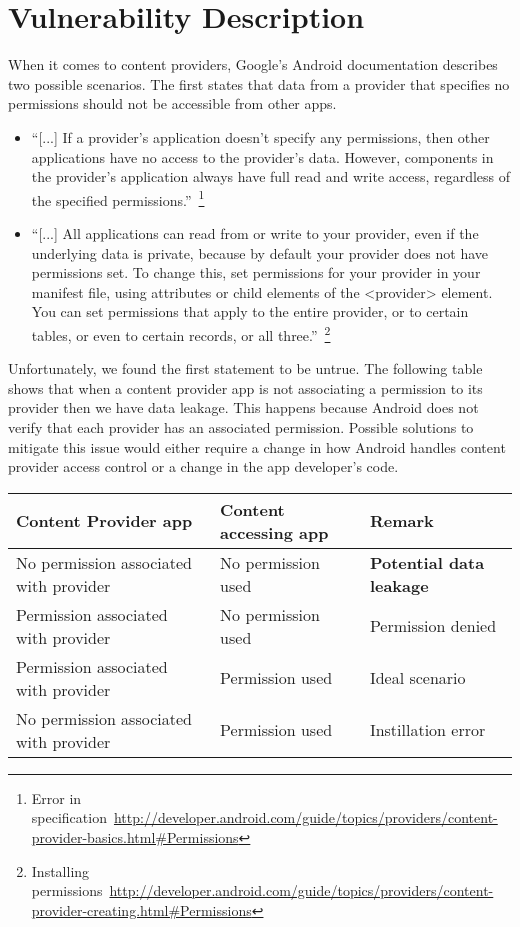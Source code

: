 \section{Vulnerability Description}
\label{vuln}
\noindent
When it comes to content providers, Google's Android documentation
describes two possible scenarios. The first states that data from
a provider
that specifies no permissions should not be accessible from other apps.
\begin{itemize}
 \item ``[...] If a provider's application doesn't specify any permissions, then other applications have no access to the provider's data. However, components in the provider's application always have full read and write access, regardless of the specified permissions.''~\footnote{Error in specification~\url{http://developer.android.com/guide/topics/providers/content-provider-basics.html#Permissions}}
 \item ``[...] All applications can read from or write to your provider, even if the underlying data is private, because by default your provider does not have permissions set. To change this, set permissions for your provider in your manifest file, using attributes or child elements of the <provider> element. You can set permissions that apply to the entire provider, or to certain tables, or even to certain records, or all three.''~\footnote{Installing permissions~\url{http://developer.android.com/guide/topics/providers/content-provider-creating.html#Permissions}}
\end{itemize}

Unfortunately, we found the first statement to be untrue. The following table shows that when a content provider app is not associating a permission to its provider then we have data leakage. This happens because Android does not verify that each provider has an associated permission. Possible solutions to mitigate this issue would either require a change in how Android handles content provider access control or a change in the app developer's code.

\begin{center}
	\begin{tabular}{ | p{2.5cm} | p{2.5cm} | p{2cm} | }
		\hline
		\textbf{Content Provider app} & \textbf{Content accessing app} & \textbf{Remark} \\
		\hline \hline
		No permission associated with provider & No permission used & \textcolor[rgb]{0.55,0,0}{\textbf{Potential data leakage}} \\
		\hline
		Permission associated with provider & No permission used & Permission denied \\
		\hline
		Permission associated with provider & Permission used & \textcolor[rgb]{0,0.33,0}{Ideal scenario} \\
		\hline
		No permission associated with provider & Permission used & Instillation error \\
		\hline
	\end{tabular}
\end{center}
